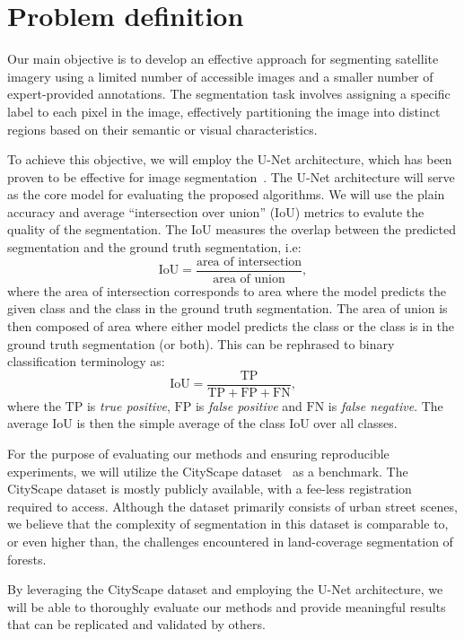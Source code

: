 \section{Problem definition}
Our main objective is to develop an effective approach for segmenting satellite imagery using a limited number of 
accessible images and a smaller number of expert-provided annotations. The segmentation task involves assigning a 
specific label to each pixel in the image, effectively partitioning the image into distinct regions based on their 
semantic or visual characteristics.

To achieve this objective, we will employ the U-Net architecture, which has been proven to be effective for image 
segmentation~\cite{unet-2015}. The U-Net architecture will serve as the core model for evaluating the proposed algorithms.
We will use the plain accuracy and average ``intersection over union'' (IoU) metrics to evalute the 
quality of the segmentation. The IoU measures the overlap between the predicted segmentation and the ground truth 
segmentation, i.e:
$$
\mathrm{IoU} = \frac{\text{area of intersection}}{\text{area of union}},
$$
where the area of intersection corresponds to area where the model predicts the given class and the class in the ground truth segmentation.
The area of union is then composed of area where either model predicts the class or the class is in the ground truth segmentation (or both).
This can be rephrased to binary classification terminology as: 
$$
\mathrm{IoU} = \frac{\mathrm{TP}}{\mathrm{TP}+\mathrm{FP}+\mathrm{FN}},
$$
where the $\mathrm{TP}$ is \textit{true positive}, $\mathrm{FP}$ is \textit{false positive} and $\mathrm{FN}$ is \textit{false negative}. 
The average IoU is then the simple average of the class IoU over all classes. 

For the purpose of evaluating our methods and ensuring reproducible experiments, we will utilize the CityScape 
dataset~\cite{cityscapes-2016} as a benchmark. The CityScape dataset is mostly publicly available, with a fee-less 
registration required to access. Although the dataset primarily consists of urban street scenes, we believe 
that the complexity of segmentation in this dataset is comparable to, or even higher than, the challenges encountered in 
land-coverage segmentation of forests.

By leveraging the CityScape dataset and employing the U-Net architecture, we will be able to thoroughly evaluate our 
methods and provide meaningful results that can be replicated and validated by others.

